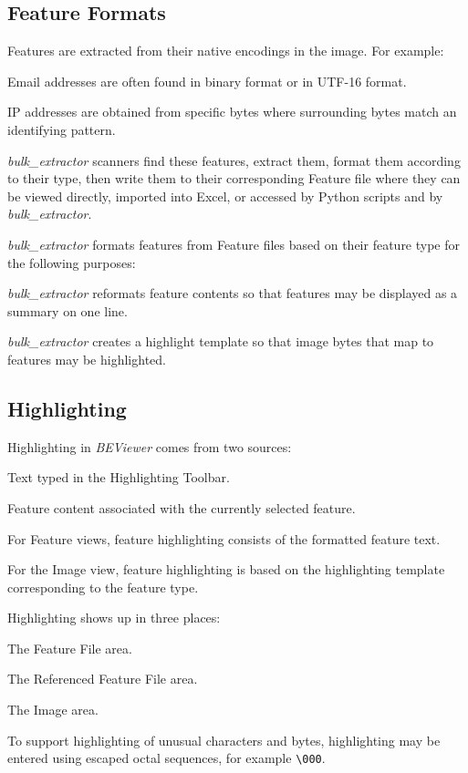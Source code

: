 \documentclass[10pt,twoside]{article}
\newcommand{\bulk}{\emph{bulk\_extractor}\xspace}
\newcommand{\bev}{\emph{BEViewer}\xspace}
\begin{document}
\subsection{Feature Formats}
Features are extracted from their native encodings in the image.
For example:
\begin{compactitem}
\item Email addresses are often found in binary format or in UTF-16 format.
\item IP addresses are obtained from specific bytes
where surrounding bytes match an identifying pattern.
\end{compactitem}
\bulk scanners find these features, extract them, format them according to their type, then write them to their corresponding Feature file
where they can be viewed directly, imported into Excel, or accessed by Python scripts and by \bulk.

\bulk formats features from Feature files based on their feature type for the following purposes:
\begin{compactitem}
\item \bulk reformats feature contents so that features may be displayed as a summary on one line.
\item \bulk creates a highlight template
so that image bytes that map to features may be highlighted.
\end{compactitem}
\subsection{Highlighting}
Highlighting in \bev comes from two sources:
\begin{compactitem}
\item Text typed in the Highlighting Toolbar.
\item Feature content associated with the currently selected feature.
\begin{compactitem}
\item For Feature views, feature highlighting consists of the formatted feature text.
\item For the Image view, feature highlighting is based on the highlighting template
corresponding to the feature type.
\end{compactitem}
\end{compactitem}
Highlighting shows up in three places:
\begin{compactitem}
\item The Feature File area.
\item The Referenced Feature File area.
\item The Image area.
\end{compactitem}
To support highlighting of unusual characters and bytes,
highlighting may be entered using escaped octal sequences,
for example \texttt{\textbackslash 000}.
\end{document}
